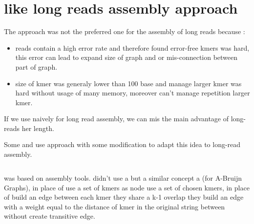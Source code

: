 \documentclass[main]{subfiles}
\begin{document}
\section{\DBG like long reads assembly approach} \label{section:sota:wtdbg}


The \DBG approach was not the preferred one for the assembly of long reads because :
\begin{itemize}
    \item reads contain a high error rate and therefore found error-free kmers was hard, this error can lead to expand size of graph and or mis-connection between part of graph.
    \item size of kmer was generaly lower than 100 base and manage larger kmer was hard without usage of many memory, moreover \DBG can't manage repetition larger kmer.
\end{itemize}

If we use \DBG naively for long read assembly, we can mis the main advantage of long-reads her length.

Some \flye and \wtdbg use \DBG approach with some modification to adapt this idea to long-read assembly.


\subsection{\flye}

\flye\cite{Flye} was based on \abruijn\cite{abruijn} assembly tools. \abruijn didn't use a \DBG but a similar concept a  (for A-Bruijn Graphs), in place of use a set of kmers as node  use a set of chosen kmers, in place of build an edge between each kmer they share a k-1 overlap they build an edge with a weight equal to the distance of kmer in the original string between without create transitive edge.
\end{document}
